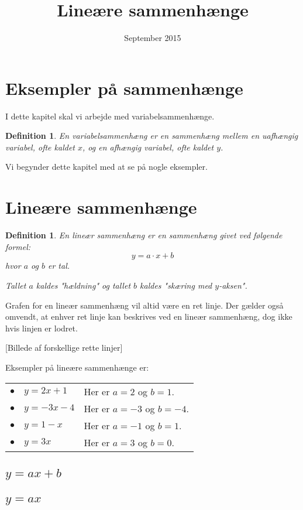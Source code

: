 \documentclass[12pt,oneside,a4paper]{article}
\title{Lineære sammenhænge}
\date{September 2015}
\newtheorem{mydef}[thm]{Definition}
\begin{document}
\maketitle

\section{Eksempler på sammenhænge}
I dette kapitel skal vi arbejde med variabelsammenhænge.

\begin{mydef}
En variabelsammenhæng er en sammenhæng mellem en uafhængig variabel, ofte kaldet $x$, og en afhængig variabel, ofte kaldet $y$.
\end{mydef}

Vi begynder dette kapitel med at se på nogle eksempler.
\section{Lineære sammenhænge}
\begin{mydef}
    En lineær sammenhæng er en sammenhæng givet ved følgende formel:
    $$
    y = a\cdot x + b
    $$
    hvor $a$ og $b$ er tal.
    
    Tallet $a$ kaldes "hældning" og tallet $b$ kaldes "skæring med $y$-aksen".
\end{mydef}
Grafen for en lineær sammenhæng vil altid være en ret linje. Der gælder også
omvendt, at enhver ret linje kan beskrives ved en lineær sammenhæng, dog ikke hvis linjen er lodret.

[Billede af forskellige rette linjer]

Eksempler på lineære sammenhænge er:

\begin{tabular}{ll}
    $\bullet\quad y=2x+1$  & Her er $a=2$ og $b=1$. \\
    $\bullet\quad y=-3x-4$ & Her er $a=-3$ og $b=-4$. \\
    $\bullet\quad y=1-x$   & Her er $a=-1$ og $b=1$. \\
    $\bullet\quad y=3x$    & Her er $a=3$ og $b=0$.
\end{tabular}


\subsection{$y=ax+b$}
\subsection{$y=ax$}
\end{document}
